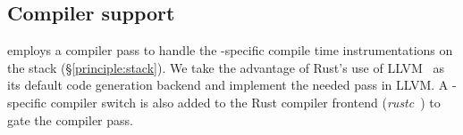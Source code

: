 \subsection{Compiler support}
\label{impl:compiler}
\projname{} employs a compiler pass to handle the \projname{}-specific
    compile time instrumentations on the stack (\S\ref{principle:stack}).
We take the advantage of Rust's use of LLVM~\cite{llvm} as its default code
    generation backend and implement the needed pass in LLVM.
A \projname{}-specific compiler switch is also added to the Rust compiler
    frontend (\emph{rustc}~\cite{rustc}) to gate the \projname{} compiler pass.